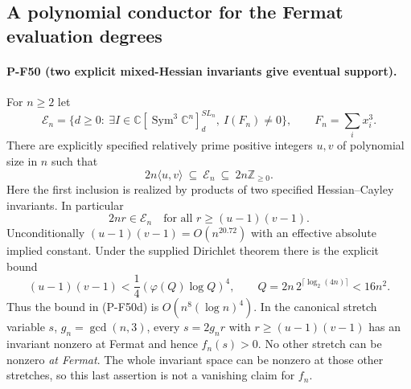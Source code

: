\subsection{A polynomial conductor for the Fermat evaluation degrees}
\label{sec:fermat-conductor}

\paragraph{P-F50 (two explicit mixed-Hessian invariants give eventual support).}
For $n\ge2$ let
\[
 \mathscr E_n=\{d\ge0:\ \exists I\in
     \mathbb C[\operatorname{Sym}^3\mathbb C^n]^{SL_n}_d,
                           \ I(F_n)\ne0\},
      \qquad F_n=\sum_i x_i^3.                         \tag{P-F50a}
\]
There are explicitly specified relatively prime positive
integers $u,v$ of polynomial size in $n$ such that
\[
          2n\langle u,v\rangle\ \subseteq\ \mathscr E_n
                         \ \subseteq\ 2n\mathbb Z_{\ge0}.
                                                        \tag{P-F50b}
\]
Here the first inclusion is realized by products of two
specified Hessian--Cayley invariants. In particular
\[
               2nr\in\mathscr E_n
             \quad\text{for all }r\ge (u-1)(v-1).
                                                        \tag{P-F50c}
\]
Unconditionally $(u-1)(v-1)=O(n^{20.72})$ with an
effective absolute implied constant. Under the supplied
Dirichlet theorem there is the explicit bound
\[
 (u-1)(v-1)<\frac14(\varphi(Q)\log Q)^4,
 \qquad Q=2n\,2^{\lceil\log_2(4n)\rceil}<16n^2.
                                                        \tag{P-F50d}
\]
Thus the bound in (P-F50d) is $O(n^8(\log n)^4)$.
In the canonical stretch variable $s$, $g_n=\gcd(n,3)$,
every $s=2g_nr$ with $r\ge(u-1)(v-1)$ has an invariant
nonzero at Fermat and hence $f_n(s)>0$.
No other stretch can be nonzero \emph{at Fermat}.
The whole invariant space can be nonzero at those other
stretches, so this last assertion is not a vanishing
claim for $f_n$.


